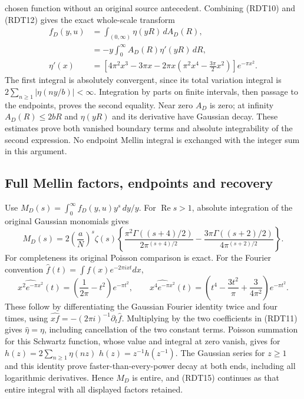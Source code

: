 chosen function without an original source antecedent.
Combining (RDT10) and (RDT12) gives the exact whole-scale transform
\begin{equation}\tag{RDT14}
\begin{split}
f_D(y,u)&=\int_{(0,\infty)}\eta(yR)\,dA_D(R),\\
&=-y\int_0^\infty A_D(R)\eta'(yR)\,dR,\\
\eta'(x)&=\left[4\pi^2x^3-3\pi x
-2\pi x\left(\pi^2x^4-\frac{3\pi}{2}x^2\right)\right]e^{-\pi x^2}.
\end{split}
\end{equation}
The first integral is absolutely convergent, since its total variation
integral is $2\sum_{n\ge1}|\eta(ny/b)|<\infty$. Integration by parts
on finite intervals, then passage to the endpoints, proves the
second equality. Near zero $A_D$ is zero; at infinity
$A_D(R)\le2bR$ and $\eta(yR)$ and its derivative have Gaussian
decay. These estimates prove both vanished boundary terms and
absolute integrability of the second expression. No endpoint Mellin
integral is exchanged with the integer sum in this argument.
\subsection{Full Mellin factors, endpoints and recovery}
Use $M_D(s)=\int_0^\infty f_D(y,u)y^s\,dy/y$.
For $\operatorname{Re}s>1$, absolute integration of the original
Gaussian monomials gives
\begin{equation}\tag{RDT15}
M_D(s)=2\left(\frac aN\right)^s\zeta(s)
\left\{
\frac{\pi^2\Gamma((s+4)/2)}{2\pi^{(s+4)/2}}
-\frac{3\pi\Gamma((s+2)/2)}{4\pi^{(s+2)/2}}
\right\}.
\end{equation}
For completeness its original Poisson comparison is exact. For the
Fourier convention $\widehat f(t)=\int f(x)e^{-2\pi ixt}dx$,
\[
\widehat{x^2e^{-\pi x^2}}(t)
=\left(\frac1{2\pi}-t^2\right)e^{-\pi t^2},\qquad
\widehat{x^4e^{-\pi x^2}}(t)
=\left(t^4-\frac{3t^2}{\pi}+\frac3{4\pi^2}\right)e^{-\pi t^2}.
\]
These follow by differentiating the Gaussian Fourier identity twice
and four times, using $\widehat{xf}=-(2\pi i)^{-1}\partial_t\widehat f$.
Multiplying by the two coefficients in (RDT11) gives
$\widehat\eta=\eta$, including cancellation of the two constant terms.
Poisson summation for this Schwartz function, whose value and integral
at zero vanish, gives for $h(z)=2\sum_{n\ge1}\eta(nz)$
$h(z)=z^{-1}h(z^{-1})$. The Gaussian series for $z\ge1$ and this
identity prove faster-than-every-power decay at both ends, including
all logarithmic derivatives. Hence $M_D$ is entire, and (RDT15)
continues as that entire integral with all displayed factors retained.

